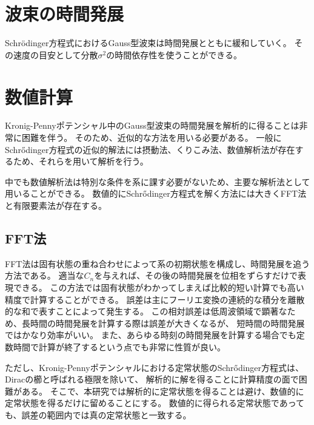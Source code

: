 \documentclass[autodetect-engine,dvipdfmx-if-dvi,ja=standard,a4paper,layout=v2]{bxjsreport}
\begin{document}
    \section{波束の時間発展}
    Schrödinger方程式におけるGauss型波束は時間発展とともに緩和していく。
    その速度の目安として分散$\sigma^2$の時間依存性を使うことができる。
    \section{数値計算}
    Kronig-Pennyポテンシャル中のGauss型波束の時間発展を解析的に得ることは非常に困難を伴う。
    そのため、近似的な方法を用いる必要がある。
    一般にSchrődinger方程式の近似的解法には摂動法、くりこみ法、数値解析法が存在するため、それらを用いて解析を行う。\par
    中でも数値解析法は特別な条件を系に課す必要がないため、主要な解析法として用いることができる。
    数値的にSchrődinger方程式を解く方法には大きくFFT法と有限要素法が存在する。
    \subsection{FFT法}
    FFT法は固有状態の重ね合わせによって系の初期状態を構成し、時間発展を追う方法である。
    適当な$C_{n}$を与えれば、その後の時間発展を位相をずらすだけで表現できる。
    この方法では固有状態がわかってしまえば比較的短い計算でも高い精度で計算することができる。
    誤差は主にフーリエ変換の連続的な積分を離散的な和で表すことによって発生する。
    この相対誤差は低周波領域で顕著なため、長時間の時間発展を計算する際は誤差が大きくなるが、
    短時間の時間発展ではかなり効率がいい。
    また、あらゆる時刻の時間発展を計算する場合でも定数時間で計算が終了するという点でも非常に性質が良い。\par
    ただし、Kronig-Pennyポテンシャルにおける定常状態のSchrődinger方程式は、Diracの櫛と呼ばれる極限を除いて、
    解析的に解を得ることに計算精度の面で困難がある。
    そこで、本研究では解析的に定常状態を得ることは避け、数値的に定常状態を得るだけに留めることにする。
    数値的に得られる定常状態であっても、誤差の範囲内では真の定常状態と一致する。
\end{document}
